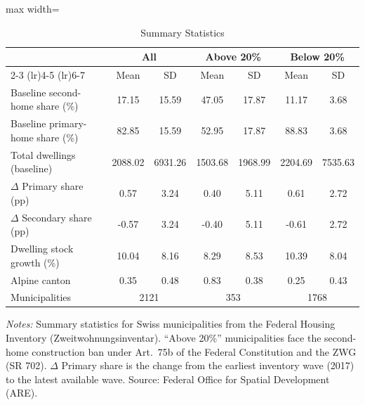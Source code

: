 \begin{table}[htbp]
\centering
\caption{Summary Statistics}
\label{tab:summary}
\begin{adjustbox}{max width=\textwidth}
\begin{tabular}{lcccccc}
\toprule
 & \multicolumn{2}{c}{All} & \multicolumn{2}{c}{Above 20\%} & \multicolumn{2}{c}{Below 20\%} \\
\cmidrule(lr){2-3} \cmidrule(lr){4-5} \cmidrule(lr){6-7}
 & Mean & SD & Mean & SD & Mean & SD \\
\midrule
Baseline second-home share (\%) & 17.15 & 15.59 & 47.05 & 17.87 & 11.17 & 3.68 \\
Baseline primary-home share (\%) & 82.85 & 15.59 & 52.95 & 17.87 & 88.83 & 3.68 \\
Total dwellings (baseline) & 2088.02 & 6931.26 & 1503.68 & 1968.99 & 2204.69 & 7535.63 \\
$\Delta$ Primary share (pp) & 0.57 & 3.24 & 0.40 & 5.11 & 0.61 & 2.72 \\
$\Delta$ Secondary share (pp) & -0.57 & 3.24 & -0.40 & 5.11 & -0.61 & 2.72 \\
Dwelling stock growth (\%) & 10.04 & 8.16 & 8.29 & 8.53 & 10.39 & 8.04 \\
Alpine canton & 0.35 & 0.48 & 0.83 & 0.38 & 0.25 & 0.43 \\
\midrule
Municipalities & \multicolumn{2}{c}{2121} & \multicolumn{2}{c}{353} & \multicolumn{2}{c}{1768} \\
\bottomrule
\end{tabular}
\end{adjustbox}
\begin{tablenotes}[flushleft]\footnotesize
\item \textit{Notes:} Summary statistics for Swiss municipalities from the Federal Housing Inventory (Zweitwohnungsinventar). ``Above 20\%'' municipalities face the second-home construction ban under Art.~75b of the Federal Constitution and the ZWG (SR 702). $\Delta$ Primary share is the change from the earliest inventory wave (2017) to the latest available wave. Source: Federal Office for Spatial Development (ARE).
\end{tablenotes}
\end{table}
